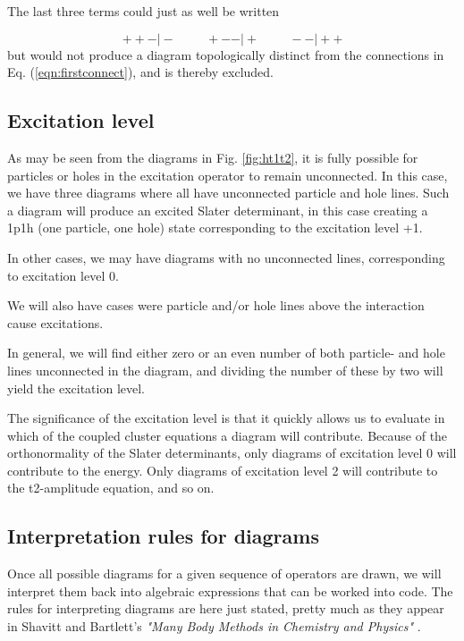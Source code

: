 The last three terms could just as well be written

\begin{equation}
 + + -\vert  -  \hspace{1cm}  + - - \vert  + \hspace{1cm} - - \vert  + +
\end{equation}
but would not produce a diagram topologically distinct from the
connections in Eq. (\ref{eqn:firstconnect}), and is thereby excluded.


\subsection{Excitation level}

As may be seen from the diagrams in Fig. \ref{fig:ht1t2}, it is
fully possible for particles or holes in the excitation operator to
remain unconnected. In this case, we have three diagrams where all
have unconnected particle and hole lines. Such a diagram will produce
an excited Slater determinant, in this case creating a 1p1h (one
particle, one hole) state corresponding to the excitation level +1.

In other cases, we may have diagrams with no unconnected lines, corresponding to excitation level 0.

We will also have cases were particle and/or hole lines above the interaction cause excitations.

In general, we will find either zero or an even number of both particle- and hole lines unconnected in the diagram, and dividing the number of these by two will yield the excitation level.

The significance of the excitation level is that it quickly allows us to evaluate in which of the coupled cluster equations a diagram will contribute. Because of the orthonormality of the Slater determinants, only diagrams of excitation level 0 will contribute to the energy. Only diagrams of excitation level 2 will contribute to the t2-amplitude equation, and so on.

\subsection{Interpretation rules for diagrams}

Once all possible diagrams for a given sequence of operators are drawn, we will interpret them back into algebraic expressions that can be worked into code. The rules for interpreting diagrams are here just stated, pretty much as they appear in Shavitt and Bartlett's \emph{"Many Body Methods in Chemistry and Physics"} \cite[Chapter 9]{ShavittBartlett2009}.

